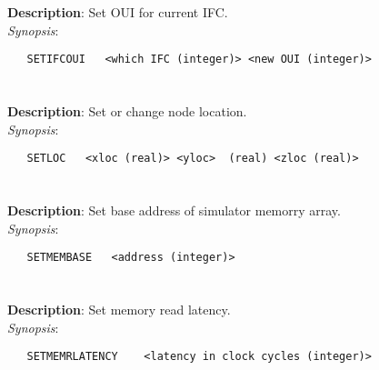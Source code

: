 \section{\quad{}}
\label{manpages:SETIFCOUI}
\label{manpages:setifcoui}
\vspace{-0.1in}
{\bf Description}: 	Set OUI for current IFC.\\[1.5ex]
{\em Synopsis}:
\vspace{-0.05in}
\scriptsize
\begin{lstlisting}
   SETIFCOUI   <which IFC (integer)> <new OUI (integer)>																	
\end{lstlisting}
\normalsize
\vspace{-0.05in}


\section{\quad{}}
\label{manpages:SETLOC}
\label{manpages:setloc}
\vspace{-0.1in}
{\bf Description}: 	Set or change node location.\\[1.5ex]
{\em Synopsis}:
\vspace{-0.05in}
\scriptsize
\begin{lstlisting}
   SETLOC   <xloc (real)> <yloc>  (real) <zloc (real)>																	
\end{lstlisting}
\normalsize
\vspace{-0.05in}


\section{\quad{}}
\label{manpages:SETMEMBASE}
\label{manpages:setmembase}
\vspace{-0.1in}
{\bf Description}: 	Set base address of simulator memorry array.\\[1.5ex]
{\em Synopsis}:
\vspace{-0.05in}
\scriptsize
\begin{lstlisting}
   SETMEMBASE   <address (integer)>						
\end{lstlisting}
\normalsize
\vspace{-0.05in}


\section{\quad{}}
\label{manpages:SETMEMRLATENCY}
\label{manpages:setmemrlatency}
\vspace{-0.1in}
{\bf Description}: 	Set memory read latency.\\[1.5ex]
{\em Synopsis}:
\vspace{-0.05in}
\scriptsize
\begin{lstlisting}
   SETMEMRLATENCY    <latency in clock cycles (integer)>																		
\end{lstlisting}
\normalsize
\vspace{-0.05in}


